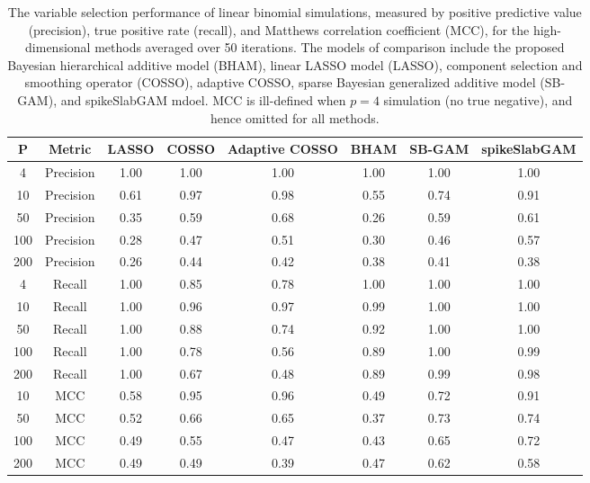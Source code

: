 \begin{table}[ht]
\centering
\begin{tabular}{cccccccc}
  \hline
P & Metric & LASSO & COSSO & Adaptive COSSO & BHAM & SB-GAM & spikeSlabGAM \\ 
  \hline
  4 & Precision & 1.00 & 1.00 & 1.00 & 1.00 & 1.00 & 1.00 \\ 
   10 & Precision & 0.61 & 0.97 & 0.98 & 0.55 & 0.74 & 0.91 \\ 
   50 & Precision & 0.35 & 0.59 & 0.68 & 0.26 & 0.59 & 0.61 \\ 
  100 & Precision & 0.28 & 0.47 & 0.51 & 0.30 & 0.46 & 0.57 \\ 
  200 & Precision & 0.26 & 0.44 & 0.42 & 0.38 & 0.41 & 0.38 \\ 
    4 & Recall & 1.00 & 0.85 & 0.78 & 1.00 & 1.00 & 1.00 \\ 
   10 & Recall & 1.00 & 0.96 & 0.97 & 0.99 & 1.00 & 1.00 \\ 
   50 & Recall & 1.00 & 0.88 & 0.74 & 0.92 & 1.00 & 1.00 \\ 
  100 & Recall & 1.00 & 0.78 & 0.56 & 0.89 & 1.00 & 0.99 \\ 
  200 & Recall & 1.00 & 0.67 & 0.48 & 0.89 & 0.99 & 0.98 \\ 
   10 & MCC & 0.58 & 0.95 & 0.96 & 0.49 & 0.72 & 0.91 \\ 
   50 & MCC & 0.52 & 0.66 & 0.65 & 0.37 & 0.73 & 0.74 \\ 
  100 & MCC & 0.49 & 0.55 & 0.47 & 0.43 & 0.65 & 0.72 \\ 
  200 & MCC & 0.49 & 0.49 & 0.39 & 0.47 & 0.62 & 0.58 \\ 
   \hline
\end{tabular}
\caption{The variable selection performance of linear binomial simulations,
                         measured by positive predictive value (precision), true positive rate (recall),
                         and Matthews correlation coefficient (MCC), for the high-dimensional methods
                         averaged over 50 iterations. The models of comparison include the proposed Bayesian
                         hierarchical additive model (BHAM), linear LASSO model (LASSO), component selection
                         and smoothing operator (COSSO), adaptive COSSO, sparse Bayesian generalized
                         additive model (SB-GAM), and spikeSlabGAM mdoel. MCC is ill-defined when $p=4$
                         simulation (no true negative), and hence omitted for all methods.} 
\label{tab:sim_lnr_binom_var_select}
\end{table}
